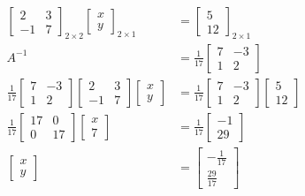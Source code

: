 \begin{example}[]
	\begin{align*}
	\begin{bmatrix} 2 & 3 \\ -1 & 7 \end{bmatrix}_{2\times 2} \begin{bmatrix} x \\ y \end{bmatrix}_{2\times 1} &= \begin{bmatrix} 5 \\ 12 \end{bmatrix}_{2\times 1}  \\
	A^{-1} &=  \frac{1}{17}\begin{bmatrix} 7 & -3 \\ 1 & 2 \end{bmatrix} \\
	\frac{1}{17}\begin{bmatrix} 7 & -3 \\ 1 & 2 \end{bmatrix} \begin{bmatrix} 2 & 3 \\ -1 & 7 \end{bmatrix} \begin{bmatrix} x \\ y \end{bmatrix} &= \frac{1}{17}\begin{bmatrix} 7 & -3 \\ 1 & 2  \end{bmatrix} \begin{bmatrix} 5 \\ 12 \end{bmatrix}  \\
	\frac{1}{17}\begin{bmatrix} 17 & 0 \\ 0 & 17 \end{bmatrix} \begin{bmatrix} x \\ 7 \end{bmatrix} &= \frac{1}{17}\begin{bmatrix} -1 \\29 \end{bmatrix}  \\
	\begin{bmatrix} x \\ y \end{bmatrix} &=  \begin{bmatrix} -\frac{1}{17} \\ \frac{29}{17} \end{bmatrix}
	\end{align*}

\end{example}

